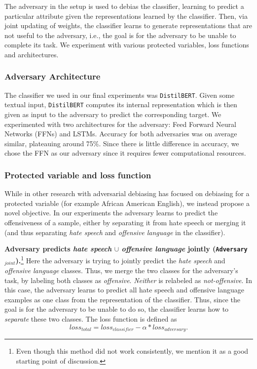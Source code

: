 \documentclass[11pt]{article}
\begin{document}
	The adversary in the setup is used to debias the classifier, learning to predict a particular attribute given the representations learned by the classifier. Then, via joint updating of weights, the classifier learns to generate representations that are not useful to the adversary, i.e., the goal is for the adversary to be unable to complete its task. We experiment with various protected variables, loss functions and architectures.
	
	\subsubsection{Adversary Architecture}
	
	The classifier we used in our final experiments was \texttt{DistilBERT}. Given some textual input, \texttt{DistilBERT} computes its internal representation which is then given as input to the adversary to predict the corresponding target. We experimented with two architectures for the adversary: Feed Forward Neural Networks (FFNs) and LSTMs. Accuracy for both adversaries was on average similar, plateauing around 75\%. Since there is little difference in accuracy, we chose the FFN as our adversary since it requires fewer computational resources.
	
	\subsubsection{Protected variable and loss function}
	\label{adv_setups}
	
	While in other research with adversarial debiasing \cite{adversarial_training_aae_hatespeech,aae_bias_hatespeech,diverse_adversaries_debiasing} has focused on debiasing for a protected variable (for example African American English), we instead propose a novel objective. In our experiments the adversary learns to predict the offensiveness of a sample, either by separating it from hate speech or merging it (and thus separating \textit{hate speech} and \textit{offensive language} in the classifier).
	
	\textbf{Adversary predicts \textit{hate speech} $\cup$ \textit{offensive language} jointly (\texttt{Adversary$_{joint}$}).}\footnote{Even though this method did not work consistently, we mention it as a good starting point of discussion.} Here the adversary is trying to jointly predict the \textit{hate speech} and \textit{offensive language} classes. Thus, we merge the two classes for the adversary's task, by labeling both classes as \textit{offensive}. \textit{Neither} is relabeled as \textit{not-offensive}. In this case, the adversary learns to predict all hate speech and offensive language examples as one class from the representation of the classifier. Thus, since the goal is for the adversary to be unable to do so, the classifier learns how to \textit{separate} these two classes. The loss function is defined as
	$$loss_{total}=loss_{classifier}-\alpha*loss_{adversary}.$$
	
\end{document}
